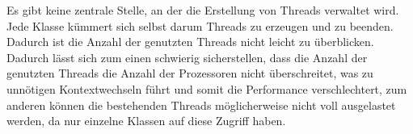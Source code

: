 Es gibt keine zentrale Stelle, an der die Erstellung von Threads verwaltet wird. Jede Klasse kümmert sich selbst darum Threads zu erzeugen und zu beenden. Dadurch ist die Anzahl der genutzten Threads nicht leicht zu überblicken. Dadurch lässt sich zum einen schwierig sicherstellen, dass die Anzahl der genutzten Threads die Anzahl der Prozessoren nicht überschreitet, was zu unnötigen Kontextwechseln führt und somit die Performance verschlechtert, zum anderen können die bestehenden Threads möglicherweise nicht voll ausgelastet werden, da nur einzelne Klassen auf diese Zugriff haben.